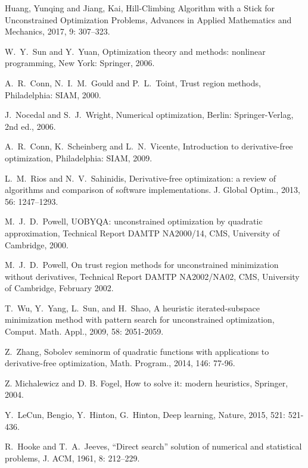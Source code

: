 \documentclass[final,1p,times]{elsarticle}
\begin{document}
\begin{thebibliography}{99}

{Huang, Yunqing and Jiang, Kai},
{Hill-Climbing Algorithm with a Stick for Unconstrained Optimization Problems},
{Advances in Applied Mathematics and Mechanics},
2017, 9: 307--323.


W.~Y.~Sun and Y.~Yuan,
Optimization theory and methods: nonlinear programming,
New York: Springer, 2006.

A.~R.~Conn, N.~I.~M.~Gould and P.~L.~Toint,
Trust region methods, Philadelphia: SIAM, 2000.

J.~Nocedal and S.~J.~Wright,
Numerical optimization, 
Berlin: Springer-Verlag, 2nd ed., 2006.

A.~R.~Conn, K.~Scheinberg and L.~N.~Vicente,
Introduction to derivative-free optimization,
Philadelphia: SIAM, 2009.

L.~M.~Rios and N.~V.~Sahinidis,
Derivative-free optimization: a review of algorithms and comparison
  of software implementations.
{J. Global Optim.}, 2013, 56: 1247--1293.

M.~J.~D.~Powell, UOBYQA: unconstrained optimization by quadratic
approximation, Technical Report DAMTP NA2000/14, CMS, University
of Cambridge, 2000.

M.~J.~D.~Powell, On trust region methods for unconstrained
minimization without derivatives, Technical Report DAMTP
NA2002/NA02, CMS, University of Cambridge, February 2002.

T.~Wu, Y.~Yang, L.~Sun, and H.~Shao, A heuristic
iterated-subspace minimization method with pattern search for
unconstrained optimization, 
Comput. Math. Appl., 2009, 58: 2051-2059.

Z.~Zhang, Sobolev seminorm of quadratic functions with
applications to derivative-free optimization, Math. Program.,
2014, 146: 77-96.

Z. Michalewicz and D. B. Fogel, How to solve it: modern
heuristics, Springer, 2004.

Y.~LeCun, Bengio, Y.~Hinton, G.~Hinton, Deep learning, Nature,
2015, 521: 521-436.

R.~Hooke and T.~A.~Jeeves,
``Direct search'' solution of numerical and statistical problems,
{J. ACM}, 1961, 8: 212--229.


\end{thebibliography}
\end{document}
